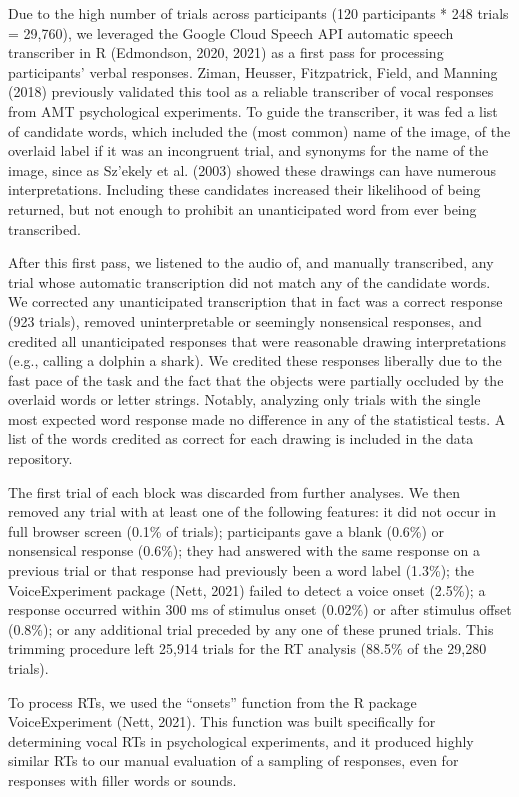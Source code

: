 \documentclass[
  ,man,floatsintext]{apa6}
\begin{document}
Due to the high number of trials across participants (120 participants * 248 trials = 29,760), we leveraged the Google Cloud Speech API automatic speech transcriber in R (Edmondson, 2020, 2021) as a first pass for processing participants' verbal responses. Ziman, Heusser, Fitzpatrick, Field, and Manning (2018) previously validated this tool as a reliable transcriber of vocal responses from AMT psychological experiments. To guide the transcriber, it was fed a list of candidate words, which included the (most common) name of the image, of the overlaid label if it was an incongruent trial, and synonyms for the name of the image, since as Sz'ekely et al. (2003) showed these drawings can have numerous interpretations. Including these candidates increased their likelihood of being returned, but not enough to prohibit an unanticipated word from ever being transcribed.

After this first pass, we listened to the audio of, and manually transcribed, any trial whose automatic transcription did not match any of the candidate words. We corrected any unanticipated transcription that in fact was a correct response (923 trials), removed uninterpretable or seemingly nonsensical responses, and credited all unanticipated responses that were reasonable drawing interpretations (e.g., calling a dolphin a shark). We credited these responses liberally due to the fast pace of the task and the fact that the objects were partially occluded by the overlaid words or letter strings. Notably, analyzing only trials with the single most expected word response made no difference in any of the statistical tests. A list of the words credited as correct for each drawing is included in the data repository.

The first trial of each block was discarded from further analyses. We then removed any trial with at least one of the following features: it did not occur in full browser screen (0.1\% of trials); participants gave a blank (0.6\%) or nonsensical response (0.6\%); they had answered with the same response on a previous trial or that response had previously been a word label (1.3\%); the VoiceExperiment package (Nett, 2021) failed to detect a voice onset (2.5\%); a response occurred within 300 ms of stimulus onset (0.02\%) or after stimulus offset (0.8\%); or any additional trial preceded by any one of these pruned trials. This trimming procedure left 25,914 trials for the RT analysis (88.5\% of the 29,280 trials).

To process RTs, we used the ``onsets'' function from the R package VoiceExperiment (Nett, 2021). This function was built specifically for determining vocal RTs in psychological experiments, and it produced highly similar RTs to our manual evaluation of a sampling of responses, even for responses with filler words or sounds.
\end{document}
